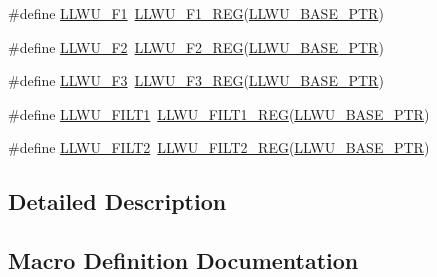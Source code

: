 \begin{DoxyCompactItemize}
\item 
\#define \hyperlink{group___l_l_w_u___register___accessor___macros_ga0b1034b705393cb19dc8bdc643242e0b}{L\+L\+W\+U\+\_\+\+F1}~\hyperlink{group___l_l_w_u___register___accessor___macros_ga3f4c680add377053731e36faf88c85c2}{L\+L\+W\+U\+\_\+\+F1\+\_\+\+R\+EG}(\hyperlink{group___l_l_w_u___peripheral_ga89c97b9e8756088cb3d8617c022ae6ac}{L\+L\+W\+U\+\_\+\+B\+A\+S\+E\+\_\+\+P\+TR})
\item 
\#define \hyperlink{group___l_l_w_u___register___accessor___macros_gaf234482694d2528fddefe57b14eaa942}{L\+L\+W\+U\+\_\+\+F2}~\hyperlink{group___l_l_w_u___register___accessor___macros_ga9824713b71d34e05dd1783c6e0153a3c}{L\+L\+W\+U\+\_\+\+F2\+\_\+\+R\+EG}(\hyperlink{group___l_l_w_u___peripheral_ga89c97b9e8756088cb3d8617c022ae6ac}{L\+L\+W\+U\+\_\+\+B\+A\+S\+E\+\_\+\+P\+TR})
\item 
\#define \hyperlink{group___l_l_w_u___register___accessor___macros_gaaf3f95074e10d498b1522014ab7d5bfe}{L\+L\+W\+U\+\_\+\+F3}~\hyperlink{group___l_l_w_u___register___accessor___macros_ga8369b30780db4c76aa70c8adf1a763fa}{L\+L\+W\+U\+\_\+\+F3\+\_\+\+R\+EG}(\hyperlink{group___l_l_w_u___peripheral_ga89c97b9e8756088cb3d8617c022ae6ac}{L\+L\+W\+U\+\_\+\+B\+A\+S\+E\+\_\+\+P\+TR})
\item 
\#define \hyperlink{group___l_l_w_u___register___accessor___macros_ga0ccd44a49b9f822b80e5d8c4935d94fe}{L\+L\+W\+U\+\_\+\+F\+I\+L\+T1}~\hyperlink{group___l_l_w_u___register___accessor___macros_ga1c17851f00a54116b482596824ddd13c}{L\+L\+W\+U\+\_\+\+F\+I\+L\+T1\+\_\+\+R\+EG}(\hyperlink{group___l_l_w_u___peripheral_ga89c97b9e8756088cb3d8617c022ae6ac}{L\+L\+W\+U\+\_\+\+B\+A\+S\+E\+\_\+\+P\+TR})
\item 
\#define \hyperlink{group___l_l_w_u___register___accessor___macros_gae5e6484abe7ce06b0e85852c098959e7}{L\+L\+W\+U\+\_\+\+F\+I\+L\+T2}~\hyperlink{group___l_l_w_u___register___accessor___macros_ga5b8d2b94b1ac6dfdf82b7eaee7760152}{L\+L\+W\+U\+\_\+\+F\+I\+L\+T2\+\_\+\+R\+EG}(\hyperlink{group___l_l_w_u___peripheral_ga89c97b9e8756088cb3d8617c022ae6ac}{L\+L\+W\+U\+\_\+\+B\+A\+S\+E\+\_\+\+P\+TR})
\end{DoxyCompactItemize}


\subsection{Detailed Description}


\subsection{Macro Definition Documentation}
